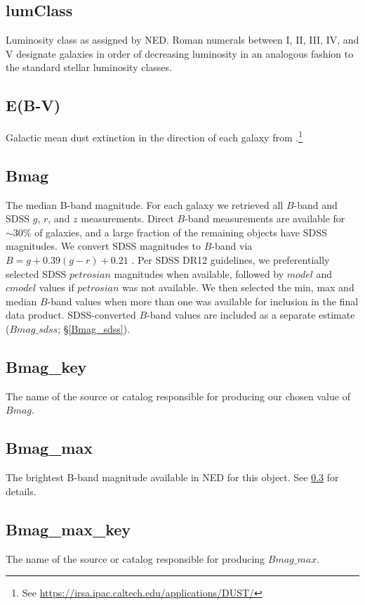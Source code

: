 \subsection{lumClass} \label{lumClass}
Luminosity class as assigned by NED. Roman numerals between I, II, III, IV, and V designate galaxies in order of decreasing luminosity in an analogous fashion to the standard stellar luminosity classes.

\subsection{E(B-V)} \label{E(B-V)}
Galactic mean dust extinction in the direction of each galaxy from \cite{schlafly2011}.\footnote{See \url{https://irsa.ipac.caltech.edu/applications/DUST/}}


\subsection{Bmag} \label{Bmag}
The median B-band magnitude. For each galaxy we retrieved all $B$-band and SDSS $g$, $r$, and $z$ measurements. Direct $B$-band measurements are available for $\sim 30\%$ of galaxies, and a large fraction of the remaining objects have SDSS magnitudes. We convert SDSS magnitudes to $B$-band via $B = g + 0.39 (g-r) + 0.21$ \citep{jester2005}. Per SDSS DR12 guidelines, we preferentially selected SDSS $petrosian$ magnitudes when available, followed by $model$ and $cmodel$ values if $petrosian$ was not available. We then selected the min, max and median $B$-band values when more than one was available for inclusion in the final data product. SDSS-converted $B$-band values are included as a separate estimate ($Bmag\_sdss$; \S \ref{Bmag_sdss}). 

\subsection{Bmag\_key} \label{Bmag_key}
The name of the source or catalog responsible for producing our chosen value of $Bmag$.

\subsection{Bmag\_max}
The brightest B-band magnitude available in NED for this object. See \ref{Bmag} for details.

\subsection{Bmag\_max\_key}
The name of the source or catalog responsible for producing $Bmag\_max$.

